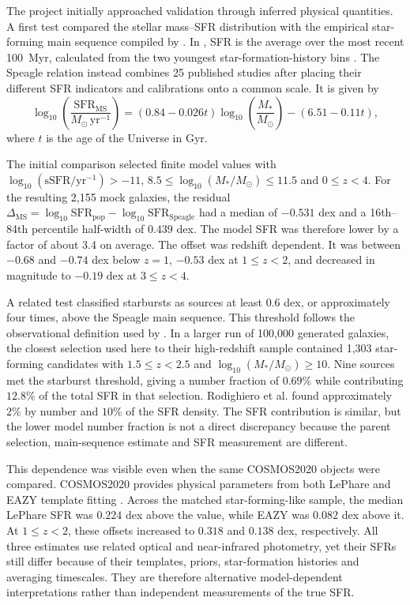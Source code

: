 \documentclass[12pt,a4paper]{article}
\begin{document}
The project initially approached validation through inferred physical quantities. A
first test compared the \popcosmos{} stellar mass--SFR distribution with the empirical
star-forming main sequence compiled by \citet{Speagle_2014}. In \popcosmos{}, SFR is
the average over the most recent \SI{100}{Myr}, calculated from the two youngest
star-formation-history bins \citep{Thorp_2025_insights}. The Speagle relation instead
combines 25 published studies after placing their different SFR indicators and
calibrations onto a common scale. It is given by
\begin{equation}
  \log_{10}\!\left(\frac{\mathrm{SFR}_{\mathrm{MS}}}{M_\odot\,\mathrm{yr}^{-1}}\right)
  = (0.84-0.026t)\log_{10}\!\left(\frac{M_*}{M_\odot}\right)
    -(6.51-0.11t),
  \label{eq:speagle}
\end{equation}
where $t$ is the age of the Universe in Gyr.

The initial comparison selected finite model values with
$\log_{10}(\mathrm{sSFR}/\mathrm{yr}^{-1})>-11$,
$8.5\leq\log_{10}(M_*/M_\odot)\leq11.5$ and $0\leq z<4$. For the resulting 2,155
mock galaxies, the residual
$\Delta_{\mathrm{MS}}=\log_{10}\mathrm{SFR}_{\mathrm{pop}}
-\log_{10}\mathrm{SFR}_{\mathrm{Speagle}}$ had a median of $-0.531$ dex and a
16th--84th percentile half-width of $0.439$ dex. The model SFR was therefore lower by
a factor of about 3.4 on average. The offset was redshift dependent. It was between
$-0.68$ and $-0.74$ dex below $z=1$, $-0.53$ dex at $1\leq z<2$, and decreased in
magnitude to $-0.19$ dex at $3\leq z<4$.

A related test classified starbursts as sources at least $0.6$ dex, or approximately
four times, above the Speagle main sequence. This threshold follows the observational
definition used by \citet{Rodighiero_2011}. In a larger run of 100,000 generated
galaxies, the closest selection used here to their high-redshift sample contained 1,303
star-forming candidates with $1.5\leq z<2.5$ and
$\log_{10}(M_*/M_\odot)\geq10$. Nine sources met the starburst threshold, giving a
number fraction of $0.69\%$ while contributing $12.8\%$ of the total SFR in that
selection. Rodighiero et al. found approximately $2\%$ by number and $10\%$ of the SFR
density. The SFR contribution is similar, but the lower model number fraction is not a
direct discrepancy because the parent selection, main-sequence estimate and SFR
measurement are different.

This dependence was visible even when the same COSMOS2020 objects were compared.
COSMOS2020 provides physical parameters from both LePhare and EAZY template fitting
\citep{Weaver_2022}. Across the matched star-forming-like sample, the median LePhare
SFR was $0.224$ dex above the \popcosmos{} value, while EAZY was $0.082$ dex above it.
At $1\leq z<2$, these offsets increased to $0.318$ and $0.138$ dex, respectively.
All three estimates use related optical and near-infrared photometry, yet their SFRs
still differ because of their templates, priors, star-formation histories and averaging
timescales. They are therefore alternative model-dependent interpretations rather than
independent measurements of the true SFR.
\end{document}
